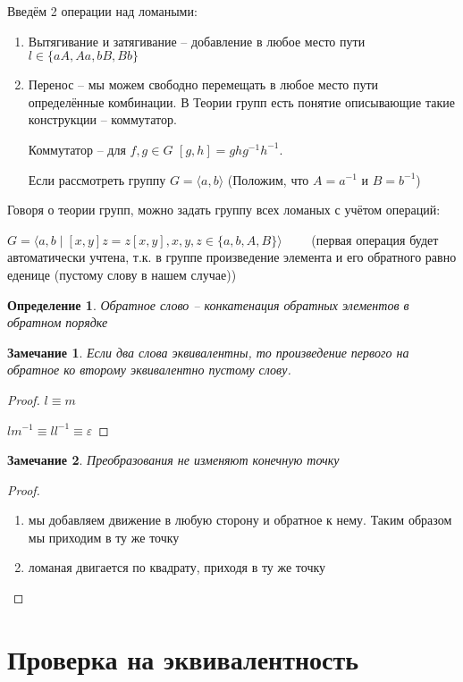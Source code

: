 \documentclass[12pt,a4paper, flushleft]{article}
\newtheorem{Def}{Определение}[section]
\newtheorem{Zm}{Замечание}[section]
\begin{document}
Введём 2 операции над ломаными:
\begin{enumerate}
	\item Вытягивание и затягивание -- добавление в любое место пути $l\in\{aA, Aa, bB, Bb\}$
	\item Перенос -- мы можем свободно перемещать в любое место пути определённые комбинации. В Теории групп есть понятие описывающие такие конструкции -- коммутатор.
	
	Коммутатор -- для $f, g\in G$  $ [g, h] = ghg^{-1}h^{-1}$. 
	
	Если рассмотреть группу $G = \langle a, b\rangle$ (Положим, что $A = a^{-1}$ и $B = b^{-1}$)
\end{enumerate}

Говоря о теории групп, можно задать группу всех ломаных с учётом операций:

$G =\langle a, b\mid [x, y]z = z[x, y], x, y, z\in \{a, b, A, B\}\rangle\quad\quad $ (первая операция будет автоматически учтена, т.к. в группе произведение элемента и его обратного равно еденице (пустому слову в нашем случае))

\begin{Def}
	Обратное слово -- конкатенация обратных элементов в обратном порядке
\end{Def}

\begin{Zm}
	Если два слова эквивалентны, то произведение первого на обратное ко второму эквивалентно пустому слову. 
\end{Zm}
\begin{proof}
	$l\equiv m$
	
	$lm^{-1} \equiv ll^{-1}\equiv \varepsilon$
\end{proof}

\begin{Zm}
	Преобразования не изменяют  конечную точку
\end{Zm}
\begin{proof}
\begin{enumerate}
	\item мы добавляем движение в любую сторону и обратное к нему. Таким образом мы приходим в ту же точку
	\item ломаная двигается по квадрату, приходя в ту же точку
\end{enumerate}
\end{proof}
\section{Проверка на эквивалентность}
\end{document}
